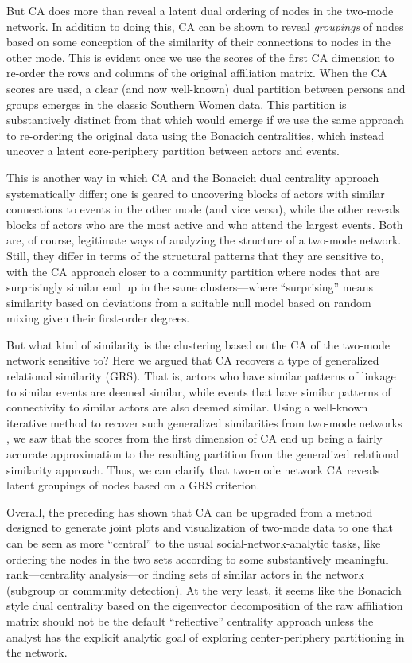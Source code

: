 \documentclass[a4paper,fleqn]{cas-sc}
\begin{document}
But CA does more than reveal a latent dual ordering of nodes in the two-mode network. In addition to doing this, CA can be shown to reveal \textit{groupings} of nodes based on some conception of the similarity of their connections to nodes in the other mode. This is evident once we use the scores of the first CA dimension to re-order the rows and columns of the original affiliation matrix. When the CA scores are used, a clear (and now well-known) dual partition between persons and groups emerges in the classic Southern Women data. This partition is substantively distinct from that which would emerge if we use the same approach to re-ordering the original data using the Bonacich centralities, which instead uncover a latent core-periphery partition between actors and events. 

This is another way in which CA and the Bonacich dual centrality approach systematically differ; one is geared to uncovering blocks of actors with similar connections to events in the other mode (and vice versa), while the other reveals blocks of actors who are the most active and who attend the largest events. Both are, of course, legitimate ways of analyzing the structure of a two-mode network. Still, they differ in terms of the structural patterns that they are sensitive to, with the CA approach closer to a community partition where nodes that are surprisingly similar end up in the same clusters---where ``surprising'' means similarity based on deviations from a suitable null model based on random mixing given their first-order degrees. 

But what kind of similarity is the clustering based on the CA of the two-mode network sensitive to? Here we argued that CA recovers a type of generalized relational similarity (GRS). That is, actors who have similar patterns of linkage to similar events are deemed similar, while events that have similar patterns of connectivity to similar actors are also deemed similar. Using a well-known iterative method to recover such generalized similarities from two-mode networks \citep{jeh2002simrank}, we saw that the scores from the first dimension of CA end up being a fairly accurate approximation to the resulting partition from the generalized relational similarity approach. Thus, we can clarify that two-mode network CA reveals latent groupings of nodes based on a GRS criterion. 

Overall, the preceding has shown that CA can be upgraded from a method designed to generate joint plots and visualization of two-mode data to one that can be seen as more ``central'' to the usual social-network-analytic tasks, like ordering the nodes in the two sets according to some substantively meaningful rank---centrality analysis---or finding sets of similar actors in the network (subgroup or community detection). At the very least, it seems like the Bonacich style dual centrality based on the eigenvector decomposition of the raw affiliation matrix should not be the default ``reflective'' centrality approach unless the analyst has the explicit analytic goal of exploring center-periphery partitioning in the network. 
\end{document}
